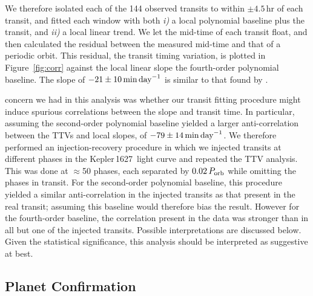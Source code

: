\documentclass[12pt,modern,twocolumn,tighten]{aastex63}
\newcommand{\sn}{Kepler\,1627} %
\begin{document}
We therefore isolated each of the 144 observed transits to within
$\pm4.5$\,hr of each transit, and fitted each window with both {\it
i)} a local polynomial baseline plus the transit, and {\it ii)} a local linear
trend.  We let the mid-time of each
transit float, and then calculated the residual between the measured
mid-time and that of a periodic orbit.  This residual, the transit
timing variation, is plotted in Figure~\ref{fig:corr} against
the local linear slope  the fourth-order polynomial baseline.  The
slope of $-21 \pm 10\,{\rm min\,day}^{-1}$ is similar to that
found by \citet{holczer_time_2015}. 

 concern we had in this analysis was whether our transit fitting
procedure might induce spurious correlations between the slope and
transit time.  In particular, assuming the second-order polynomial
baseline yielded a larger anti-correlation between the TTVs and local
slopes, of $-79 \pm 14\,{\rm min\,day}^{-1}$.  We therefore
performed an injection-recovery procedure in which we injected
transits at different phases in the \sn\ light curve and repeated the
TTV analysis.  This was done at $\approx$50 phases, each separated by
$0.02\,P_{\rm orb}$ while omitting the phases in transit.  For
the second-order polynomial baseline, this procedure yielded
a similar anti-correlation in the injected transits as that present in the real
transit;
assuming this baseline would therefore bias the
result.  However for the fourth-order baseline, the correlation
present in the data was stronger than in all but one of the injected
transits.
Possible interpretations are discussed below. Given the
statistical significance, this analysis should be interpreted as
suggestive at best.


\subsection{Planet Confirmation}
\end{document}
